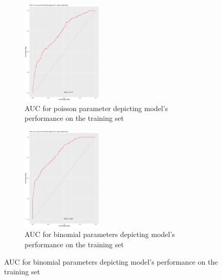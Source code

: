 \documentclass{DissertateUSU}
\begin{document}
\begin{figure}[t!] %
\begin{subfigure}{0.48\textwidth}
\includegraphics[width=\linewidth, height=5cm]{POI_ROC_Training.pdf}
\caption{AUC for poisson parameter depicting model's performance on the training set} \label{POI_ROC_Train}
\end{subfigure}\hspace*{\fill}
\begin{subfigure}{0.48\textwidth}
\includegraphics[width=\linewidth, height=5cm]{BIN_ROC_Training.pdf}
\caption{AUC for binomial parameters depicting model's performance on the training set} \label{BIN_ROC_Train}
\end{subfigure}


\end{figure}
\end{document}
